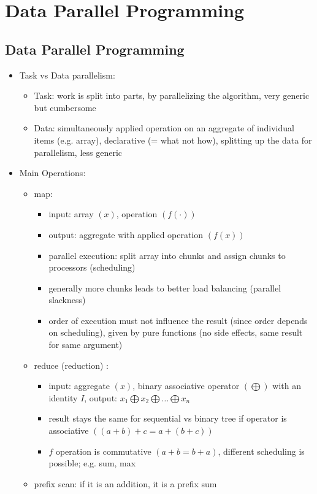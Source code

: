 \documentclass[a4paper]{article}
\begin{document}
\section{Data Parallel Programming}
\subsection{Data Parallel Programming}
\begin{itemize}
\item Task vs Data parallelism: 
\begin{itemize}
\item Task: work is split into parts, by parallelizing the algorithm, very generic but cumbersome
\item Data: simultaneously applied operation on an aggregate of individual items (e.g. array), declarative (= what not how), splitting up the data for parallelism, less generic
\end{itemize}
\item Main Operations:
\begin{itemize}
\item map: 
\begin{itemize}
\item input: array $(x)$, operation $(f(\cdot))$
\item output: aggregate with applied operation $(f(x))$
\item parallel execution: split array into chunks and assign chunks to processors (scheduling)
\item generally more chunks leads to better load balancing (parallel slackness)
\item order of execution must not influence the result (since order depends on scheduling), given by pure functions (no side effects, same result for same argument)
\end{itemize}
\item reduce (reduction) : 
\begin{itemize}
\item input: aggregate $(x)$, binary associative operator $(\bigoplus)$ with an identity $I$, output: $x_1\bigoplus x_2\bigoplus\dots\bigoplus x_n$
\item result stays the same for sequential vs binary tree if operator is associative $((a+b)+c=a+(b+c))$
\item $f$ operation is commutative $(a+b=b+a)$, different scheduling is possible; e.g. sum, max
\end{itemize}
\item prefix scan: if it is an addition, it is a prefix sum

\end{itemize}
\end{itemize}
\end{document}
